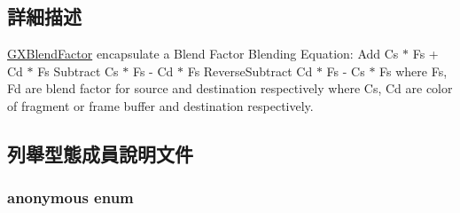 \subsection{詳細描述}
\hyperlink{class_i_dream_sky_1_1_g_x_blend_factor}{G\+X\+Blend\+Factor} encapsulate a Blend Factor Blending Equation\+: Add Cs $\ast$ Fs + Cd $\ast$ Fs Subtract Cs $\ast$ Fs -\/ Cd $\ast$ Fs Reverse\+Subtract Cd $\ast$ Fs -\/ Cs $\ast$ Fs where Fs, Fd are blend factor for source and destination respectively where Cs, Cd are color of fragment or frame buffer and destination respectively. 

\subsection{列舉型態成員說明文件}
\subsubsection[{\texorpdfstring{anonymous enum}{anonymous enum}}]{\setlength{\rightskip}{0pt plus 5cm}anonymous enum}\hypertarget{class_i_dream_sky_1_1_g_x_blend_factor_a4226ff82883fba994b921c202fc536e3}{}\label{class_i_dream_sky_1_1_g_x_blend_factor_a4226ff82883fba994b921c202fc536e3}
